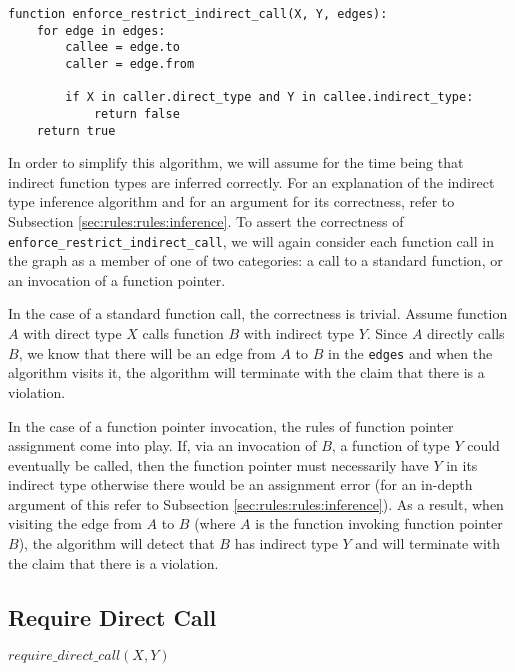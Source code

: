 \noindent\begin{lstlisting}[caption={Pseudocode for an algorithm that can check a $restrict\_indirect\_call$ constraint.  This algorithm returns \lstinline{true} if the call graph respects the constraint and \lstinline{false} if the call graph violates it.},label={lst:rules:rules:restrict_indirect_call}]
function enforce_restrict_indirect_call(X, Y, edges):
    for edge in edges:
        callee = edge.to
        caller = edge.from

        if X in caller.direct_type and Y in callee.indirect_type:
            return false
    return true
\end{lstlisting}

In order to simplify this algorithm, we will assume for the time being that indirect function types are inferred correctly.  For an explanation of the indirect type inference algorithm and for an argument for its correctness, refer to Subsection \ref{sec:rules:rules:inference}.  To assert the correctness of \lstinline{enforce_restrict_indirect_call}, we will again consider each function call in the graph as a member of one of two categories: a call to a standard function, or an invocation of a function pointer.

In the case of a standard function call, the correctness is trivial.  Assume function $A$ with direct type $X$ calls function $B$ with indirect type $Y$.  Since $A$ directly calls $B$, we know that there will be an edge from $A$ to $B$ in the \lstinline{edges} and when the algorithm visits it, the algorithm will terminate with the claim that there is a violation.

In the case of a function pointer invocation, the rules of function pointer assignment come into play.  If, via an invocation of $B$, a function of type $Y$ could eventually be called, then the function pointer must necessarily have $Y$ in its indirect type otherwise there would be an assignment error (for an in-depth argument of this refer to Subsection \ref{sec:rules:rules:inference}).  As a result, when visiting the edge from $A$ to $B$ (where $A$ is the function invoking function pointer $B$), the algorithm will detect that $B$ has indirect type $Y$ and will terminate with the claim that there is a violation.  

\subsection{Require Direct Call}

\begin{center}
    $require\_direct\_call(X, Y)$
\end{center}

